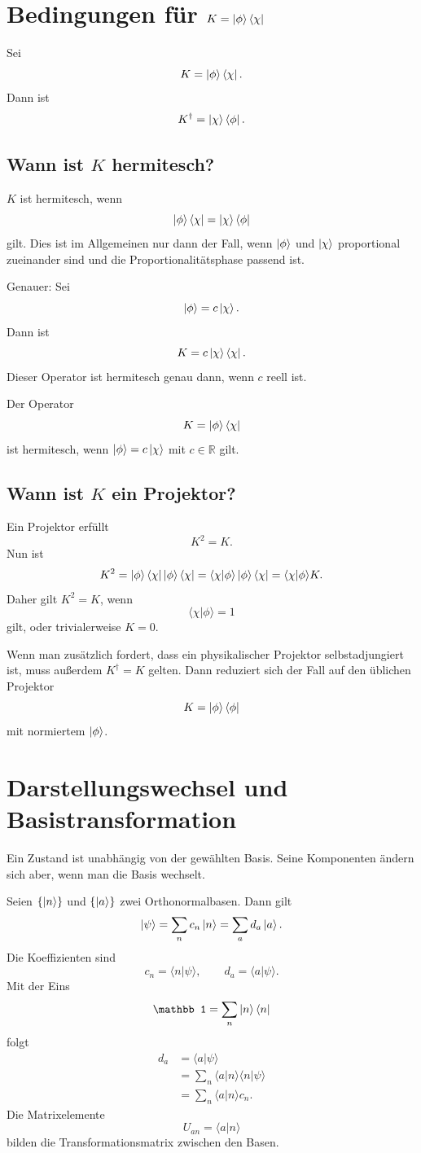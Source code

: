 \section{Bedingungen für $K=\left|\phi\right\rangle\left\langle\chi\right|$}

Sei
\[
    K=\left|\phi\right\rangle\left\langle\chi\right|.
\]
Dann ist
\[
    K^\dagger=\left|\chi\right\rangle\left\langle\phi\right|.
\]

\subsection{Wann ist $K$ hermitesch?}

$K$ ist hermitesch, wenn
\[
    \left|\phi\right\rangle\left\langle\chi\right|=\left|\chi\right\rangle\left\langle\phi\right|
\]
gilt. Dies ist im Allgemeinen nur dann der Fall, wenn $\left|\phi\right\rangle$ und $\left|\chi\right\rangle$ proportional zueinander sind und die Proportionalitätsphase passend ist.

Genauer: Sei
\[
    \left|\phi\right\rangle=c\left|\chi\right\rangle.
\]
Dann ist
\[
    K=c\left|\chi\right\rangle\left\langle\chi\right|.
\]
Dieser Operator ist hermitesch genau dann, wenn $c$ reell ist.

\begin{formulabox}
Der Operator
\[
    K=\left|\phi\right\rangle\left\langle\chi\right|
\]
ist hermitesch, wenn $\left|\phi\right\rangle=c\left|\chi\right\rangle$ mit $c\in\mathbb R$ gilt.
\end{formulabox}

\subsection{Wann ist $K$ ein Projektor?}

Ein Projektor erfüllt
\[
    K^2=K.
\]
Nun ist
\[
    K^2=\left|\phi\right\rangle\left\langle\chi\right|\left|\phi\right\rangle\left\langle\chi\right|
    =\langle\chi|\phi\rangle\left|\phi\right\rangle\left\langle\chi\right|
    =\langle\chi|\phi\rangle K.
\]
Daher gilt $K^2=K$, wenn
\[
    \langle\chi|\phi\rangle=1
\]
gilt, oder trivialerweise $K=0$.

Wenn man zusätzlich fordert, dass ein physikalischer Projektor selbstadjungiert ist, muss außerdem $K^\dagger=K$ gelten. Dann reduziert sich der Fall auf den üblichen Projektor
\[
    K=\left|\phi\right\rangle\left\langle\phi\right|
\]
mit normiertem $\left|\phi\right\rangle$.

\section{Darstellungswechsel und Basistransformation}

Ein Zustand ist unabhängig von der gewählten Basis. Seine Komponenten ändern sich aber, wenn man die Basis wechselt.

Seien $\{\left|n\right\rangle\}$ und $\{\left|a\right\rangle\}$ zwei Orthonormalbasen. Dann gilt
\[
    \left|\psi\right\rangle=\sum_n c_n\left|n\right\rangle=\sum_a d_a\left|a\right\rangle.
\]
Die Koeffizienten sind
\[
    c_n=\langle n|\psi\rangle,
    \qquad
    d_a=\langle a|\psi\rangle.
\]
Mit der Eins
\[
    \mathbb 1=\sum_n\ket n\bra n
\]
folgt
\[
\begin{aligned}
    d_a
    &=\langle a|\psi\rangle \\
    &=\sum_n\langle a|n\rangle\langle n|\psi\rangle \\
    &=\sum_n\langle a|n\rangle c_n.
\end{aligned}
\]
Die Matrixelemente
\[
    U_{an}=\langle a|n\rangle
\]
bilden die Transformationsmatrix zwischen den Basen.

